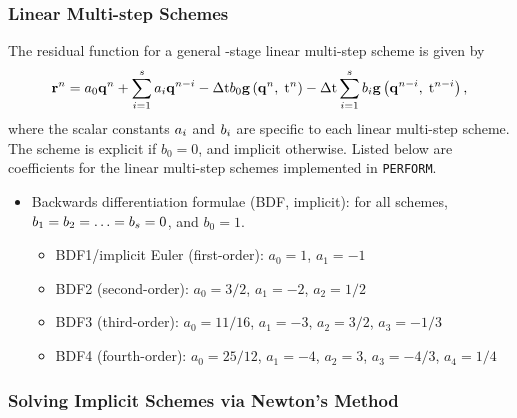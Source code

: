 \subsubsection{Linear Multi-step Schemes}

The residual function for a general \rkIdx -stage linear multi-step scheme is given by
\begin{equation}\label{eq:lmsResFOM}
    \mathbf{r}^{n} = a_0 \mathbf{q}^{n} + \sum_{i = 1}^{s} a_{i} \mathbf{q}^{n - i} - \Delta \text{t} b_0 \mathbf{g}\left(\mathbf{q}^{n}, \; \text{t}^{n}\right) - \Delta \text{t} \sum_{i = 1}^{s} b_{i} \mathbf{g}\left(\mathbf{q}^{n - i}, \; \text{t}^{n - i}\right),
\end{equation}
where the scalar constants $a_{i}$ and $b_{i}$ are specific to each linear multi-step scheme. The scheme is explicit if $b_0 = 0$, and implicit otherwise. Listed below are coefficients for the linear multi-step schemes implemented in \verb|PERFORM|.
\begin{itemize}
    \item Backwards differentiation formulae (BDF, implicit): for all schemes, $b_1 = b_2 = \hdots = b_{s} = 0$, and $b_0 = 1$.
    \begin{itemize}
        \item BDF1/implicit Euler (first-order): $a_0 = 1$, $a_1 = -1$
        \item BDF2 (second-order): $a_0 = 3/2$, $a_1 = -2$, $a_2 = 1/2$
        \item BDF3 (third-order): $a_0 = 11/16$, $a_1 = -3$, $a_2 = 3/2$, $a_3 = -1/3$
        \item BDF4 (fourth-order): $a_0 = 25/12$, $a_1 = -4$, $a_2 = 3$, $a_3 = -4/3$, $a_4 = 1/4$
    \end{itemize}
\end{itemize}

\subsubsection{Solving Implicit Schemes via Newton's Method}

